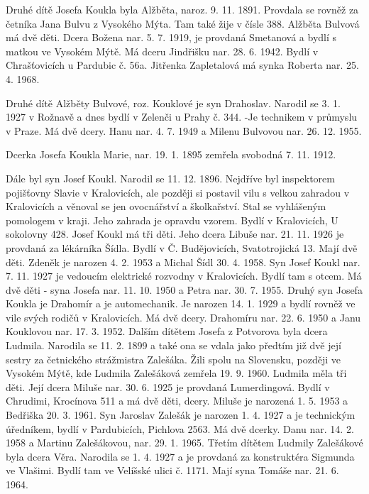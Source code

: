 \documentclass[../dejiny-rodu-prusiku.tex]{subfiles}
\begin{document}
Druhé dítě Josefa Koukla byla Alžběta, naroz. 9. 11. 1891. Provdala se rovněž za četníka Jana Bulvu z Vysokého Mýta. Tam také žije v čísle 388. Alžběta Bulvová má dvě děti. Dcera Božena nar. 5. 7. 1919, je provdaná Smetanová a bydlí s matkou ve Vysokém Mýtě. Má dceru Jindřišku nar. 28. 6. 1942. Bydlí v Chrašťovicích u Pardubic č. 56a. Jitřenka Zapletalová má synka Roberta nar. 25. 4. 1968.

Druhé dítě Alžběty Bulvové, roz. Kouklové je syn Drahoslav. Narodil se 3. 1. 1927 v Rožnavě a dnes bydlí v Zelenči u Prahy č. 344. -Je technikem v prů­myslu v Praze. Má dvě dcery. Hanu nar. 4. 7. 1949 a Milenu Bulvovou nar. 26. 12. 1955.

Dcerka Josefa Koukla Marie, nar. 19. 1. 1895 zemřela svobodná 7. 11. 1912.

Dále byl syn Josef Koukl. Narodil se 11. 12. 1896. Nejdříve byl inspektorem pojišťovny Slavie v Kralovicích, ale později  si postavil vilu s velkou zahradou v Kralovicích a věnoval se jen ovocnářství a školkařství. Stal se vyhlášeným pomologem v kraji. Jeho zahrada je opravdu vzorem. Bydlí v Kralovicích, U soko­lovny 428. Josef Koukl má tři děti. Jeho dcera Libuše nar. 21. 11. 1926 je provdaná za lékárníka Šídla. Bydlí v Č. Budějovicích, Svatotrojická 13. Mají dvě děti. Zdeněk je narozen 4. 2. 1953 a Michal Šídl 30. 4. 1958. Syn Josef Koukl nar. 7. 11. 1927 je vedoucím elektrické rozvodny v Kralovicích. Bydlí tam s otcem. Má dvě děti - syna Josefa nar. 11. 10. 1950 a Petra nar. 30. 7. 1955. Druhý syn Josefa Koukla je Drahomír a je automechanik. Je narozen 14. 1. 1929 a bydlí rovněž ve vile svých ro­dičů v Kralovicích. Má dvě dcery. Drahomíru nar. 22. 6. 1950 a Janu Kouklovou nar. 17. 3. 1952. Dalším dítětem Josefa z Potvorova byla dcera Ludmila. Narodila se 11. 2. 1899 a také ona se vdala jako předtím již dvě je­jí sestry za četnického strážmistra Zalešáka. Žili spolu na Slovensku, později ve Vysokém Mýtě, kde Lud­mila Zalešáková zemřela 19. 9. 1960. Ludmila měla tři děti. Její dcera Miluše nar. 30. 6. 1925 je provdaná Lumerdingová. Bydlí v Chrudimi, Krocínova 511 a má dvě děti, dcery. Miluše je narozená 1. 5. 1953 a Bedřiška 20. 3. 1961. Syn Jaroslav Zalešák je narozen 1. 4. 1927 a je technickým úředníkem, bydlí v Pardubicích, Pichlova 2563. Má dvě dcerky. Danu nar. 14. 2. 1958 a Martinu Zalešákovou, nar. 29. 1. 1965. Třetím dítětem Ludmily Zalešákové byla dcera Věra. Narodila se 1. 4. 1927 a je provdaná za kon­struktéra Sigmunda ve Vlašimi. Bydlí tam ve Velíšské ulici č. 1171. Mají syna Tomáše nar. 21. 6. 1964.
\end{document}
